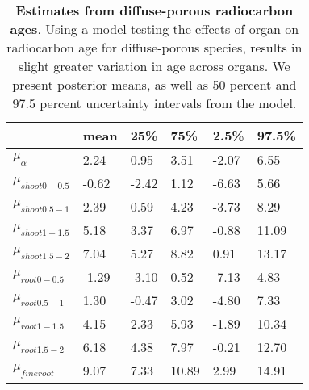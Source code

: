 \documentclass{article}\usepackage[]{graphicx}\usepackage[]{color}
\begin{document}
\begin{table}[ht]
\centering
\caption{\textbf{Estimates from diffuse-porous radiocarbon ages}. Using a model testing the effects of organ on radiocarbon age for diffuse-porous species, results in slight greater variation in age across organs. We present posterior means, as well as 50 percent and 97.5 percent uncertainty intervals from the model.} 
\label{tab:diffradio}
\begingroup\footnotesize
\begin{tabular}{|p{}|p{}|p{}|p{}|p{}|p{}|}
  \hline
 & mean & 25\% & 75\% & 2.5\% & 97.5\% \\ 
  \hline
$\mu_{\alpha}$ & 2.24 & 0.95 & 3.51 & -2.07 & 6.55 \\ 
  $\mu_{shoot 0-0.5}$ & -0.62 & -2.42 & 1.12 & -6.63 & 5.66 \\ 
  $\mu_{shoot 0.5-1}$ & 2.39 & 0.59 & 4.23 & -3.73 & 8.29 \\ 
  $\mu_{shoot 1-1.5}$ & 5.18 & 3.37 & 6.97 & -0.88 & 11.09 \\ 
  $\mu_{shoot 1.5-2}$ & 7.04 & 5.27 & 8.82 & 0.91 & 13.17 \\ 
  $\mu_{root 0-0.5}$ & -1.29 & -3.10 & 0.52 & -7.13 & 4.83 \\ 
  $\mu_{root 0.5-1}$ & 1.30 & -0.47 & 3.02 & -4.80 & 7.33 \\ 
  $\mu_{root 1-1.5}$ & 4.15 & 2.33 & 5.93 & -1.89 & 10.34 \\ 
  $\mu_{root 1.5-2}$ & 6.18 & 4.38 & 7.97 & -0.21 & 12.70 \\ 
  $\mu_{fineroot}$ & 9.07 & 7.33 & 10.89 & 2.99 & 14.91 \\ 
   \hline
\end{tabular}
\endgroup
\end{table}
\end{document}
